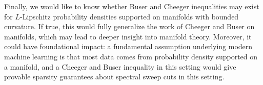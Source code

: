 Finally, we would like to know whether Buser and Cheeger inequalities may exist for $L$-Lipschitz
probability densities supported on manifolds with bounded
curvature. If true, this would fully generalize the work
of Cheeger and Buser on manifolds, which may lead to deeper
insight into manifold theory. Moreover, it could have
foundational impact:
a fundamental assumption underlying modern machine learning is
that most data comes from probability density supported on a manifold, and a Cheeger and Buser inequality in this
setting would give provable sparsity guarantees about
spectral sweep cuts in this setting.
